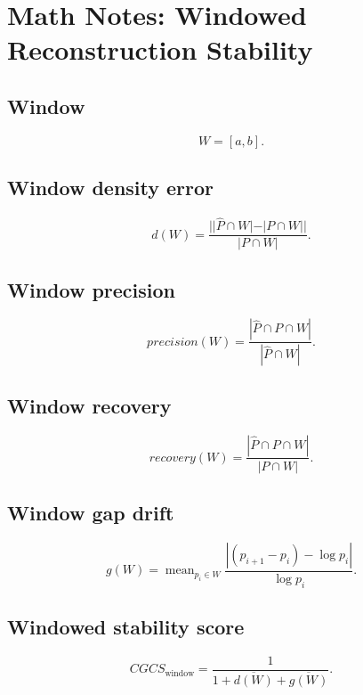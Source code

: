 \documentclass{article}
\begin{document}
\section*{Math Notes: Windowed Reconstruction Stability}

\subsection*{Window}
\[W=[a,b].\]

\subsection*{Window density error}
\[
d(W)=\frac{||\hat{P}\cap W|-|P\cap W||}{|P\cap W|}.
\]

\subsection*{Window precision}
\[
precision(W)=\frac{|\hat{P}\cap P\cap W|}{|\hat{P}\cap W|}.
\]

\subsection*{Window recovery}
\[
recovery(W)=\frac{|\hat{P}\cap P\cap W|}{|P\cap W|}.
\]

\subsection*{Window gap drift}
\[
g(W)=\operatorname{mean}_{p_i\in W}
\frac{|(p_{i+1}-p_i)-\log p_i|}{\log p_i}.
\]

\subsection*{Windowed stability score}
\[
CGCS_{\mathrm{window}}=
\frac{1}{1+\overline{d(W)}+\overline{g(W)}}.
\]
\end{document}
